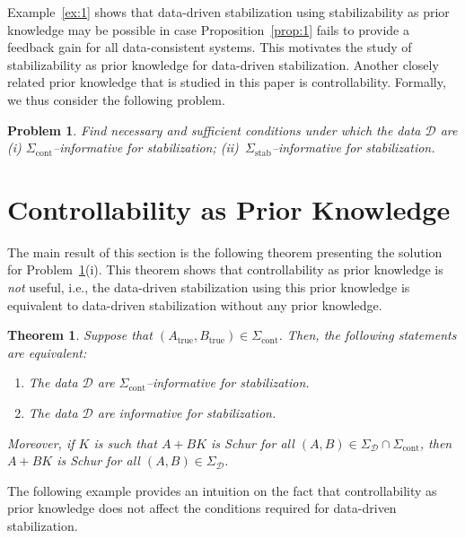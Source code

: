 \documentclass[10pt,a4paper]{amsart}
\newtheorem{theorem}{Theorem}
\newtheorem{problem}{Problem}
\begin{document}
Example~\ref{ex:1} shows that data-driven stabilization using stabilizability as prior knowledge may be possible in case Proposition~\ref{prop:1} fails to provide a feedback gain for all data-consistent systems. This motivates the study of stabilizability as prior knowledge for data-driven stabilization. Another closely related prior knowledge that is studied in this paper is controllability. Formally, we thus consider the following problem. 
\begin{problem}
\label{prob:1}
Find necessary and sufficient conditions under which the data $\mathcal{D}$ are (i) $\Sigma_\text{cont}$--informative for stabilization; \mbox{(ii) $\Sigma_\text{stab}$--informative} for stabilization.
\end{problem}



\section{Controllability as Prior Knowledge}

The main result of this section is the following theorem presenting the solution for Problem~\ref{prob:1}(i). This theorem shows that controllability as prior knowledge is \emph{not} useful, i.e., the data-driven stabilization using this prior knowledge is equivalent to data-driven stabilization without any prior knowledge. 


\begin{theorem}
\label{th:1}
Suppose that $(A_\text{true},B_\text{true})\in\Sigma_\text{cont}$. Then, the following statements are equivalent:
\begin{enumerate}[label=(\alph*),ref=\ref{th:1}(\alph*)]
    \item The data $\mathcal{D}$ are $\Sigma_\text{cont}$--informative for stabilization.
    \item The data $\mathcal{D}$ are informative for stabilization.
\end{enumerate}
Moreover, if $K$ is such that $A+BK$ is Schur for all \mbox{$(A,B)\in\Sigma_\mathcal{D}\cap\Sigma_\text{cont}$}, then $A+BK$ is Schur for all $(A,B)\in\Sigma_\mathcal{D}$. 
\end{theorem}


The following example provides an intuition on the fact that controllability as prior knowledge does not affect the conditions required for data-driven stabilization. 
\end{document}
